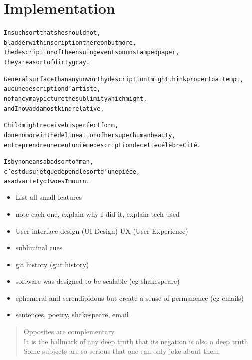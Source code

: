 
\chapter{Implementation}
\label{ch:implementation}

\startcontents[chapters]

\vfill

\begin{alltt}\sffamily
In such sort that she should not,
bladder with inscription thereon but more,
the description of the ensuing events on unstamped paper,
they are a sort of dirty gray.

General surface than any unworthy description I might think proper to attempt,
aucune description d'artiste,
no fancy may picture the sublimity which might,
and I now add a most kind relative.

Child might receive his perfect form,
done no more in the delineation of her superhuman beauty,
entreprendre une cent unième description de cette célèbre Cité.

Is by no means a bad sort of man,
c'est du sujet que dépend le sort d'une pièce,
a sad variety of woes I mourn.
\end{alltt}

\newpage
\minicontents
\spirals


\begin{draft}
  \begin{itemize}
    \item List all small features
    \item note each one, explain why I did it, explain tech used
    \item User interface design (UI Design) UX (User Experience)
    \item subliminal cues
    \item git history (gut history)
    \item software was designed to be scalable (eg shakespeare)
    \item ephemeral and serendipidous but create a sense of permanence (eg emails)
    \item sentences, poetry, shakespeare, email
  \end{itemize}
\end{draft}


\begin{quotation}
  Opposites are complementary\\
  It is the hallmark of any deep truth that its negation is also a deep truth\\
  Some subjects are so serious that one can only joke about them
\end{quotation}

